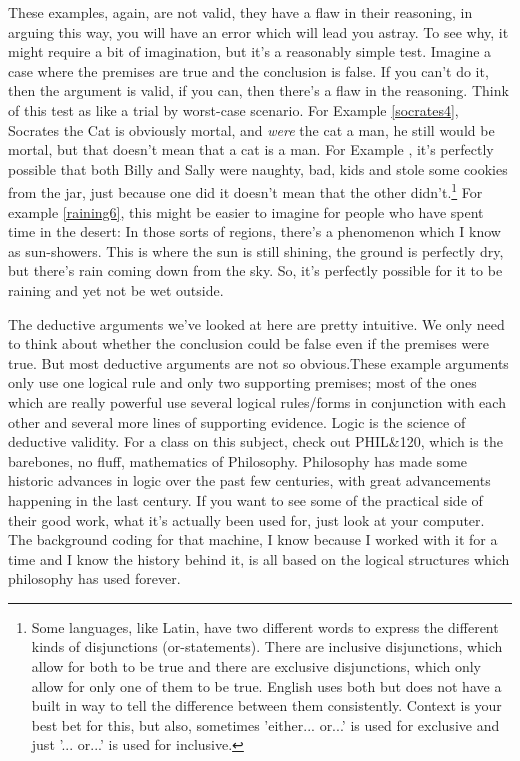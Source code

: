 These examples, again, are not valid, they have a flaw in their reasoning, in arguing this way, you will have an error which will lead you astray. To see why, it might require a bit of imagination, but it's a reasonably simple test. Imagine a case where the premises are true and the conclusion is false. If you can't do it, then the argument is valid, if you can, then there's a flaw in the reasoning. Think of this test as like a trial by worst-case scenario. For Example \ref{socrates4}, Socrates the Cat is obviously mortal, and \emph{were} the cat a man, he still would be mortal, but that doesn't mean that a cat is a man. For Example , it's perfectly possible that both Billy and Sally were naughty, bad, kids and stole some cookies from the jar, just because one did it doesn't mean that the other didn't.\footnote{Some languages, like Latin, have two different words to express the different kinds of disjunctions (or-statements). There are inclusive disjunctions, which allow for both to be true and there are exclusive disjunctions, which only allow for only one of them to be true. English uses both but does not have a built in way to tell the difference between them consistently. Context is your best bet for this, but also, sometimes 'either... or...' is used for exclusive and just '... or...' is used for inclusive.} For example \ref{raining6}, this might be easier to imagine for people who have spent time in the desert: In those sorts of regions, there's a phenomenon which I know as sun-showers. This is where the sun is still shining, the ground is perfectly dry, but there's rain coming down from the sky. So, it's perfectly possible for it to be raining and yet not be wet outside.

The deductive arguments we’ve looked at here are pretty intuitive. We only need to think about whether the conclusion could be false even if the premises were true. But most deductive arguments are not so obvious.These example arguments only use one logical rule and only two supporting premises; most of the ones which are really powerful use several logical rules/forms in conjunction with each other and several more lines of supporting evidence.  Logic is the science of deductive validity. For a class on this subject, check out PHIL\&120, which is the barebones, no fluff, mathematics of Philosophy. Philosophy has made some historic advances in logic over the past few centuries, with great advancements happening in the last century.  If you want to see some of the practical side of their good work, what it's actually been used for, just look at your computer. The background coding for that machine, I know because I worked with it for a time and I know the history behind it, is all based on the logical structures which philosophy has used forever.

